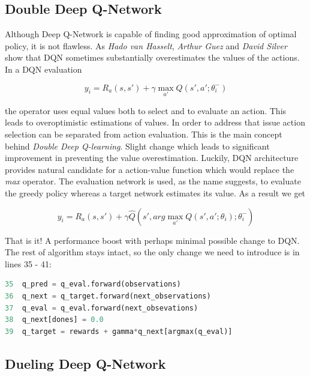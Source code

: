 \subsection{Double Deep Q-Network}
\label{sub:double-deep-q-network}

Although Deep Q-Network is capable of finding good approximation of optimal policy, it is not flawless. As \emph{Hado van Hasselt}, \emph{Arthur Guez} and \emph{David Silver} \cite{DBLP:journals/corr/HasseltGS15} show that DQN sometimes substantially overestimates the values of the actions. In a DQN evaluation

\begin{equation}
    y_i = R_a(s, s') + \gamma \max_{a'}Q(s', a'; \theta^-_i)
\end{equation}

the  operator uses equal values both to select and to evaluate an action. This leads to overoptimistic estimations of values. In order to address that issue action selection can be separated from action evaluation. This is the main concept behind \emph{Double Deep Q-learning}. Slight change which leads to significant improvement in preventing the value overestimation. Luckily, DQN architecture provides natural candidate for a action-value function which would replace the \emph{max} operator. The evaluation network is used, as the name suggests, to evaluate the greedy policy whereas a target network estimates its value. As a result we get

\begin{equation}
    y_i = R_a(s, s') + \gamma \hat{Q}(s', arg\max_{a'}Q(s', a'; \theta_i); \theta^-_i)
\end{equation}

That is it! A performance boost with perhaps minimal possible change to DQN. The rest of algorithm stays intact, so the only change we need to introduce is in lines 35 - 41:

\begin{lstlisting}[language=Python, caption={Double Deep Q-learning modification}]
35  q_pred = q_eval.forward(observations)
36  q_next = q_target.forward(next_observations)
37  q_eval = q_eval.forward(next_obsevations)
38  q_next[dones] = 0.0
39  q_target = rewards + gamma*q_next[argmax(q_eval)]
\end{lstlisting}

\subsection{Dueling Deep Q-Network}
\label{sub:dueling-deep-q-network}


